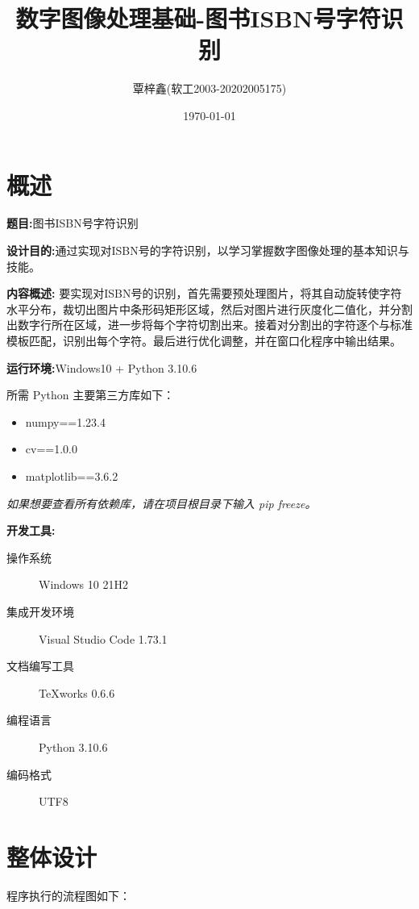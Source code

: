 \documentclass{ctexart}
\begin{document}
\title{数字图像处理基础-图书ISBN号字符识别}
\author{覃梓鑫(软工2003-20202005175)}
\date{\today}
\maketitle
\tableofcontents
\newpage
\section{概述}
\noindent
\textbf{题目:}图书ISBN号字符识别

\textbf{设计目的:}通过实现对ISBN号的字符识别，以学习掌握数字图像处理的基本知识与技能。

\textbf{内容概述:}
要实现对ISBN号的识别，首先需要预处理图片，将其自动旋转使字符水平分布，裁切出图片中条形码矩形区域，然后对图片进行灰度化二值化，并分割出数字行所在区域，进一步将每个字符切割出来。接着对分割出的字符逐个与标准模板匹配，识别出每个字符。最后进行优化调整，并在窗口化程序中输出结果。

\textbf{运行环境:}Windows10 + Python 3.10.6

所需 Python 主要第三方库如下：
\begin{itemize}
    \item numpy==1.23.4
    \item cv==1.0.0
    \item matplotlib==3.6.2
\end{itemize}

\textit{如果想要查看所有依赖库，请在项目根目录下输入 pip freeze。 }

\textbf{开发工具:}%
\begin{description}
    \item[操作系统] Windows 10 21H2
    \item[集成开发环境] Visual Studio Code 1.73.1
    \item[文档编写工具] TeXworks 0.6.6
    \item[编程语言] Python 3.10.6
    \item[编码格式] UTF8
\end{description}

\section{整体设计}

程序执行的流程图如下：
\end{document}
